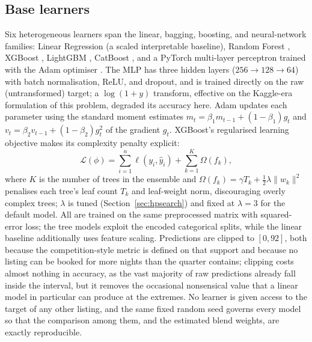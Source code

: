 \documentclass[journal]{IEEEtran}
\begin{document}
\subsection{Base learners}
Six heterogeneous learners span the linear, bagging, boosting, and neural-network
families: Linear Regression (a scaled interpretable baseline), Random Forest
\cite{breiman2001}, XGBoost \cite{chen2016xgboost}, LightGBM \cite{ke2017lightgbm},
CatBoost \cite{prokhorenkova2018catboost}, and a PyTorch \cite{paszke2019pytorch}
multi-layer perceptron trained with the Adam optimiser \cite{kingma2015adam}. The
MLP has three hidden layers ($256\!\to\!128\!\to\!64$) with batch normalisation,
ReLU, and dropout, and is trained directly on the raw (untransformed) target; a
$\log(1+y)$ transform, effective on the Kaggle-era formulation of this problem,
degraded its accuracy here. Adam updates each parameter using the standard moment
estimates $m_t=\beta_1 m_{t-1}+(1-\beta_1)g_t$ and
$v_t=\beta_2 v_{t-1}+(1-\beta_2)g_t^2$ of the gradient $g_t$. XGBoost's regularised
learning objective makes its complexity penalty explicit:
\begin{equation}
\mathcal{L}(\phi) = \sum_{i=1}^{n}\ell(y_i,\hat y_i) + \sum_{k=1}^{K}\Omega(f_k),
\label{eq:xgb-obj}
\end{equation}
where $K$ is the number of trees in the ensemble and
$\Omega(f_k)=\gamma T_k+\tfrac12\lambda\lVert w_k\rVert^2$ penalises each tree's
leaf count $T_k$ and leaf-weight norm, discouraging overly complex trees; $\lambda$
is tuned (Section~\ref{sec:hpsearch}) and fixed at $\lambda=3$ for the default model.
All are trained on the same preprocessed matrix
with squared-error loss; the tree models exploit the encoded categorical splits,
while the linear baseline additionally uses feature scaling. Predictions are
clipped to $[0,92]$, both because the competition-style metric is defined on that
support and because no listing can be booked for more nights than the quarter
contains; clipping costs almost nothing in accuracy, as the vast majority of raw
predictions already fall inside the interval, but it removes the occasional
nonsensical value that a linear model in particular can produce at the extremes. No
learner is given access to the target of any other listing, and the same fixed
random seed governs every model so that the comparison among them, and the estimated
blend weights, are exactly reproducible.
\end{document}
